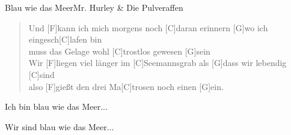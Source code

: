 \begin{song}{Blau wie das Meer}{Mr. Hurley \& Die Pulveraffen}
    \begin{verse}
        Und [F]kann ich mich morgens noch [C]daran erinnern [G]wo ich eingesch[C]lafen bin \\
        [F]muss das Gelage wohl [C]trostlos gewesen [G]sein \\
        Wir [F]liegen viel länger im [C]Seemannsgrab als [G]dass wir lebendig [C]sind \\
        also [F]gießt den drei Ma[C]trosen noch einen [G]ein.
    \end{verse}
    
    \begin{chorus}  %
        [C]Ich bin blau wie das Meer...
    \end{chorus}
    
    \begin{chorus}
        [C]Wir sind blau wie das Meer...
    \end{chorus}
     
    \begin{outro}
        [C  F  Am  G] \\
        [C  F  Am  G C G C]
    \end{outro}

\end{song}

